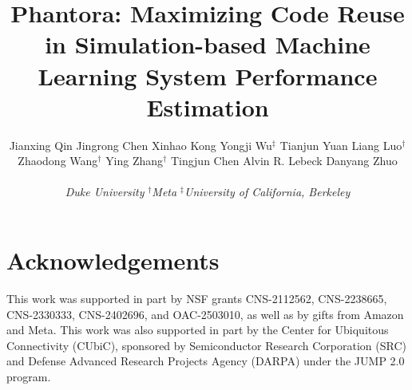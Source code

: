 \documentclass[letterpaper,twocolumn,10pt]{article}
\newcommand{\sys}{Phantora\xspace}
\begin{document}
\date{}

\title{\sys: Maximizing Code Reuse in Simulation-based Machine Learning System Performance Estimation} 

\author{
\textup{Jianxing Qin} \enskip \textup{Jingrong Chen} \enskip \textup{Xinhao Kong} \enskip \textup{Yongji Wu}$^\ddag$ \enskip \textup{Tianjun Yuan} \enskip \textup{Liang Luo}$^\dagger$
\\
\textup{Zhaodong Wang}$^\dagger$ \enskip \textup{Ying Zhang}$^\dagger$ \enskip \textup{Tingjun Chen} \enskip \textup{Alvin R. Lebeck} \enskip \textup{Danyang Zhuo}
\\
\\
\textit{Duke University} \enskip $^\dagger$\textit{Meta} \enskip $^\ddag$\textit{University of California, Berkeley}
} %

\maketitle










\section*{Acknowledgements}
This work was supported in part by NSF grants CNS-2112562, CNS-2238665, CNS-2330333, CNS-2402696, and OAC-2503010, as well as by gifts from Amazon and Meta.
This work was also supported in part by the Center for Ubiquitous Connectivity (CUbiC), sponsored by Semiconductor Research Corporation (SRC) and Defense Advanced Research Projects Agency (DARPA) under the JUMP 2.0 program.






\end{document}
